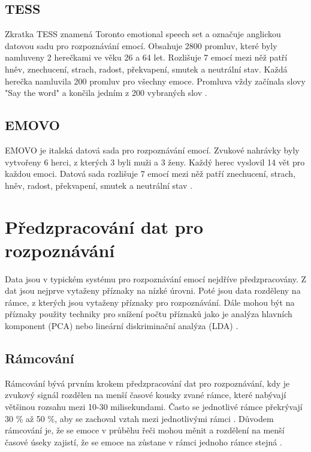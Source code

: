 \documentclass[FM,BP]{tulthesis}
\begin{document}
\subsection{TESS}
Zkratka TESS \cite{SP2/E8H2MF_2020} znamená Toronto emotional speech set a označuje anglickou datovou sadu pro rozpoznávání emocí. Obsahuje 2800 promluv, které byly namluveny 2 herečkami ve věku 26 a 64 let. Rozlišuje 7 emocí mezi něž patří hněv, znechucení, strach, radost, překvapení, smutek a neutrální stav. Každá herečka namluvila 200 promluv pro všechny emoce. Promluva vždy začínala slovy "Say the word" a končila jedním z 200 vybraných slov \cite{tess}.

\subsection{EMOVO}
EMOVO \cite{DBLP:conf/lrec/CostantiniIPT14} je italská datová sada pro rozpoznávání emocí. Zvukové nahrávky byly vytvořeny 6 herci, z kterých 3 byli muži a 3 ženy. Každý herec vyslovil 14 vět pro každou emoci. Datová sada rozlišuje 7 emocí mezi něž patří znechucení, strach, hněv, radost, překvapení, smutek a neutrální stav \cite{COSTANTINI14.591}.

\section{Předzpracování dat pro rozpoznávání}
Data jsou v typickém systému pro rozpoznávání emocí nejdříve předzpracovány. Z dat jsou nejprve vytaženy příznaky na nízké úrovni. Poté jsou data rozděleny na rámce, z kterých jsou vytaženy příznaky pro rozpoznávání. Dále mohou být na příznaky použity techniky pro snížení počtu příznaků jako je analýza hlavních komponent (PCA) nebo lineární diskriminační analýza (LDA) \cite{konar_chakraborty_2015}.

\subsection{Rámcování}
Rámcování bývá prvním krokem předzpracování dat pro rozpoznávání, kdy je zvukový signál rozdělen na menší časové kousky zvané rámce, které nabývají většinou rozsahu mezi 10-30 milisekundami. Často se jednotlivé rámce překrývají 30 \% až 50 \%, aby se zachoval vztah mezi jednotlivými rámci \cite{DBLP:journals/speech/AkcayO20}. Důvodem rámcování je, že se emoce v průběhu řeči mohou měnit a rozdělení na menší časové úseky zajistí, že se emoce na zůstane v rámci jednoho rámce stejná \cite{konar_chakraborty_2015}.
\end{document}
